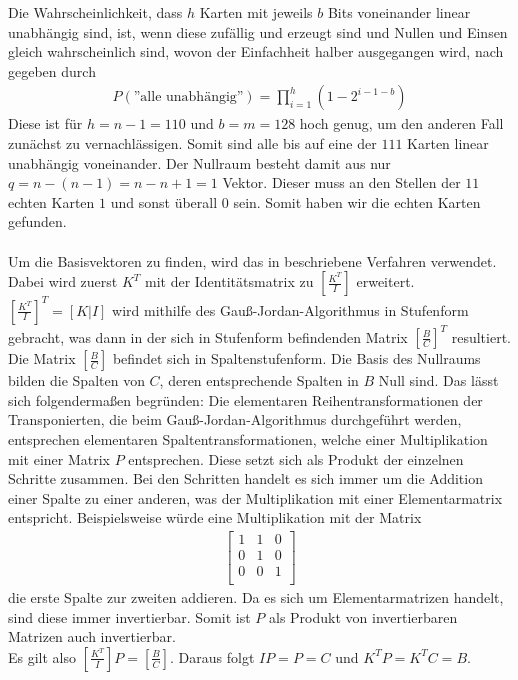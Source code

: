 \documentclass[a4paper,10pt,ngerman]{scrartcl}
\begin{document}
Die Wahrscheinlichkeit, dass $h$ Karten mit jeweils $b$ Bits voneinander linear unabhängig sind, ist, wenn diese zufällig und erzeugt sind und Nullen und Einsen gleich wahrscheinlich sind, wovon der Einfachheit halber ausgegangen wird, nach \cite{WEBSITE:1} gegeben durch
\begin{align*}
P(\text{''alle unabhängig''}) = \prod^h_{i=1} (1-2^{i-1-b})
\end{align*}
Diese ist für $h=n-1=110$ und $b=m=128$ hoch genug, um den anderen Fall zunächst zu vernachlässigen. Somit sind alle bis auf eine der $111$ Karten linear unabhängig voneinander. Der Nullraum besteht damit aus nur $q=n-(n-1)=n-n+1=1$ Vektor. Dieser muss an den Stellen der $11$ echten Karten $1$ und sonst überall $0$ sein. Somit haben wir die echten Karten gefunden. \\\\
Um die Basisvektoren zu finden, wird das in \cite{WEBSITE:2} beschriebene Verfahren verwendet. Dabei wird zuerst $K^T$ mit der Identitätsmatrix zu $\left[\frac{K^T}{I}\right]$ erweitert. $\left[\frac{K^T}{I}\right]^T=[K|I]$ wird mithilfe des Gauß-Jordan-Algorithmus in Stufenform gebracht, was dann in der sich in Stufenform befindenden Matrix $\left[\frac{B}{C}\right]^T$ resultiert. Die Matrix $\left[\frac{B}{C}\right]$ befindet sich in Spaltenstufenform. Die Basis des Nullraums bilden die Spalten von $C$, deren entsprechende Spalten in $B$ Null sind. Das lässt sich folgendermaßen begründen: Die elementaren Reihentransformationen der Transponierten, die beim Gauß-Jordan-Algorithmus durchgeführt werden, entsprechen elementaren Spaltentransformationen, welche einer Multiplikation mit einer Matrix $P$ entsprechen. Diese setzt sich als Produkt der einzelnen Schritte zusammen. Bei den Schritten handelt es sich immer um die Addition einer Spalte zu einer anderen, was der Multiplikation mit einer Elementarmatrix entspricht. Beispielsweise würde eine Multiplikation mit der Matrix
\begin{align*}
\left[\begin{array}{ccc}
1 & 1 & 0 \\
0 & 1 & 0 \\
0 & 0 & 1 \\
\end{array}\right]
\end{align*}
die erste Spalte zur zweiten addieren. Da es sich um Elementarmatrizen handelt, sind diese immer invertierbar. Somit ist $P$ als Produkt von invertierbaren Matrizen auch invertierbar. \\
Es gilt also $\left[\frac{K^T}{I}\right] P = \left[\frac{B}{C}\right]$. Daraus folgt $I P = P = C$ und $K^T P = K^T C = B$.
\end{document}
